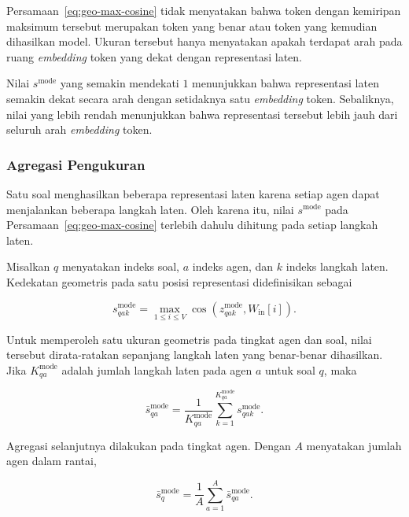 Persamaan~\eqref{eq:geo-max-cosine} tidak menyatakan bahwa token dengan
kemiripan maksimum tersebut merupakan token yang benar atau token yang
kemudian dihasilkan model. Ukuran tersebut hanya menyatakan apakah terdapat
arah pada ruang \textit{embedding} token yang dekat dengan representasi laten.

Nilai $s^{\mathrm{mode}}$ yang semakin mendekati $1$ menunjukkan bahwa
representasi laten semakin dekat secara arah dengan setidaknya satu
\textit{embedding} token. Sebaliknya, nilai yang lebih rendah menunjukkan
bahwa representasi tersebut lebih jauh dari seluruh arah \textit{embedding}
token.



\subsubsection{Agregasi Pengukuran}

Satu soal menghasilkan beberapa representasi laten karena setiap agen dapat
menjalankan beberapa langkah laten. Oleh karena itu, nilai
$s^{\mathrm{mode}}$ pada Persamaan~\eqref{eq:geo-max-cosine} terlebih dahulu
dihitung pada setiap langkah laten.

Misalkan $q$ menyatakan indeks soal, $a$ indeks agen, dan $k$ indeks langkah
laten. Kedekatan geometris pada satu posisi representasi didefinisikan sebagai

\begin{equation}
    s_{qak}^{\mathrm{mode}}
    =
    \max_{1\leq i\leq V}
    \cos
    \left(
        z_{qak}^{\mathrm{mode}},
        W_{\mathrm{in}}[i]
    \right).
    \label{eq:geo-score-position}
\end{equation}

Untuk memperoleh satu ukuran geometris pada tingkat agen dan soal, nilai
tersebut dirata-ratakan sepanjang langkah laten yang benar-benar dihasilkan.
Jika $K_{qa}^{\mathrm{mode}}$ adalah jumlah langkah laten pada agen $a$ untuk
soal $q$, maka

\begin{equation}
    \bar{s}_{qa}^{\mathrm{mode}}
    =
    \frac{1}{K_{qa}^{\mathrm{mode}}}
    \sum_{k=1}^{K_{qa}^{\mathrm{mode}}}
    s_{qak}^{\mathrm{mode}}.
    \label{eq:geo-agregasi-langkah}
\end{equation}

Agregasi selanjutnya dilakukan pada tingkat agen. Dengan $A$ menyatakan
jumlah agen dalam rantai,

\begin{equation}
    \bar{s}_{q}^{\mathrm{mode}}
    =
    \frac{1}{A}
    \sum_{a=1}^{A}
    \bar{s}_{qa}^{\mathrm{mode}}.
    \label{eq:geo-agregasi-agen}
\end{equation}

